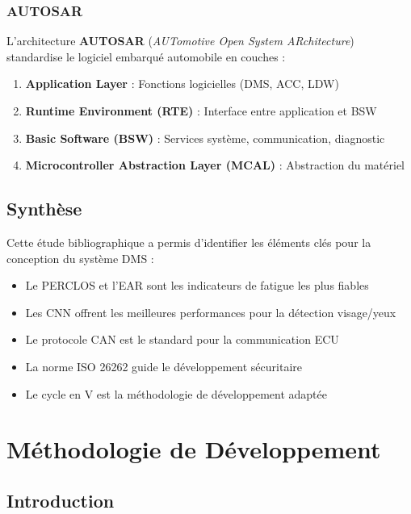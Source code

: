 \documentclass[12pt,a4paper,twoside]{report}
\newcommand{\keyword}[1]{\textbf{\textcolor{stellantisblue}{#1}}}
\begin{document}
\subsection{AUTOSAR}

L'architecture \keyword{AUTOSAR} \cite{autosar2022} (\textit{AUTomotive Open System ARchitecture}) standardise le logiciel embarqué automobile en couches :

\begin{enumerate}
    \item \textbf{Application Layer} : Fonctions logicielles (DMS, ACC, LDW)
    \item \textbf{Runtime Environment (RTE)} : Interface entre application et BSW
    \item \textbf{Basic Software (BSW)} : Services système, communication, diagnostic
    \item \textbf{Microcontroller Abstraction Layer (MCAL)} : Abstraction du matériel
\end{enumerate}

\section{Synthèse}

Cette étude bibliographique a permis d'identifier les éléments clés pour la conception du système DMS :
\begin{itemize}
    \item Le PERCLOS et l'EAR sont les indicateurs de fatigue les plus fiables
    \item Les CNN offrent les meilleures performances pour la détection visage/yeux
    \item Le protocole CAN est le standard pour la communication ECU
    \item La norme ISO 26262 guide le développement sécuritaire
    \item Le cycle en V est la méthodologie de développement adaptée
\end{itemize}


\chapter{Méthodologie de Développement}

\section{Introduction}
\end{document}
